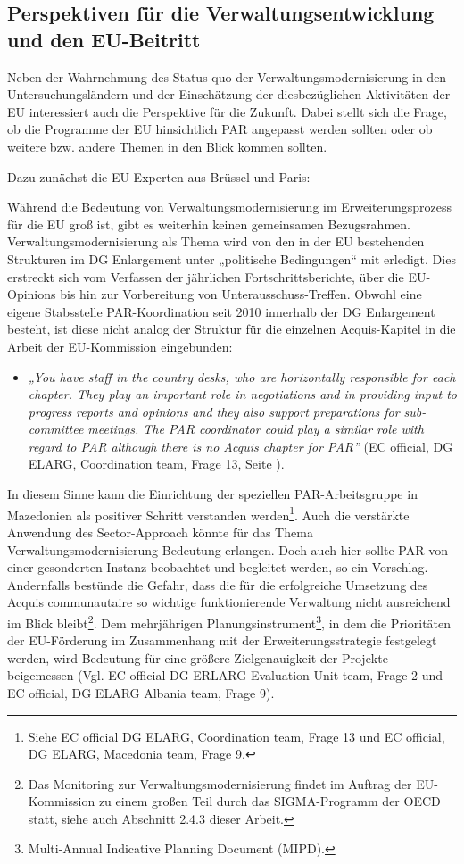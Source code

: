 \subsection{Perspektiven für die Verwaltungsentwicklung und den EU-Beitritt }
Neben der Wahrnehmung des Status quo der Verwaltungsmodernisierung in den Untersuchungsländern und der Einschätzung der diesbezüglichen Aktivitäten der EU interessiert auch die Perspektive für die Zukunft. Dabei stellt sich die Frage, ob die Programme der EU hinsichtlich PAR angepasst werden sollten oder ob weitere bzw. andere Themen in den Blick kommen sollten.\par
Dazu zunächst die EU-Experten aus Brüssel und Paris: \par
Während die Bedeutung von Verwaltungsmodernisierung im Erweiterungsprozess für die EU groß ist, gibt es weiterhin keinen gemeinsamen Bezugsrahmen. Verwaltungsmodernisierung als Thema wird von den in der EU bestehenden Strukturen im DG Enlargement unter „politische Bedingungen“ mit erledigt. Dies erstreckt sich vom Verfassen der jährlichen Fortschrittsberichte, über die EU-Opinions bis hin zur Vorbereitung von Unterausschuss-Treffen. Obwohl eine eigene Stabsstelle PAR-Koordination seit 2010 innerhalb der DG Enlargement besteht, ist diese nicht analog der Struktur für die einzelnen Acquis-Kapitel in die Arbeit der EU-Kommission eingebunden:
\begin{itemize}[label={}]
\item \textit{„You have staff in the country desks, who are horizontally responsible for each chapter. They play an important role in negotiations and in providing input to progress reports and opinions and they also support preparations for sub-committee meetings. The PAR coordinator could play a similar role with regard to PAR although there is no Acquis chapter for PAR”} (EC official, DG ELARG, Coordination team, Frage 13, Seite \pageref{sec:montenegro3}).
\end{itemize}
In diesem Sinne kann die Einrichtung der speziellen PAR-Arbeitsgruppe in Mazedonien als positiver Schritt verstanden werden\footnote{Siehe EC official DG ELARG, Coordination team, Frage 13 und EC official, DG ELARG, Macedonia team, Frage 9.}. Auch die verstärkte Anwendung des Sector-Approach könnte für das Thema Verwaltungsmodernisierung Bedeutung erlangen. Doch auch hier sollte PAR von einer gesonderten Instanz beobachtet und begleitet werden, so ein Vorschlag. Andernfalls bestünde die Gefahr, dass die für die erfolgreiche Umsetzung des Acquis communautaire so wichtige funktionierende Verwaltung nicht ausreichend im Blick bleibt\footnote{Das Monitoring zur Verwaltungsmodernisierung findet im Auftrag der EU-Kommission zu einem großen Teil durch das SIGMA-Programm der OECD statt, siehe auch Abschnitt 2.4.3 dieser Arbeit.}. Dem mehrjährigen Planungsinstrument\footnote{Multi-Annual Indicative Planning Document (MIPD).}, in dem die Prioritäten der EU-Förderung im Zusammenhang mit der Erweiterungsstrategie festgelegt werden, wird Bedeutung für eine größere Zielgenauigkeit der Projekte beigemessen (Vgl. EC official DG ERLARG Evaluation Unit team, Frage 2 und EC official, DG ELARG Albania team, Frage 9).

